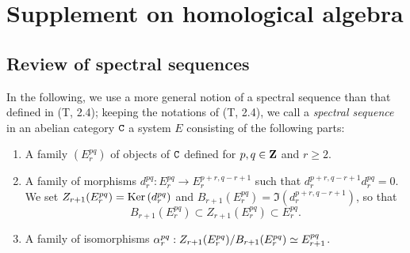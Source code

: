 \section{Supplement on homological algebra}
\label{section:supplement-on-homological-algebra}

\subsection{Review of spectral sequences}
\label{subsection:review-spectral-sequences}

\begin{env}[11.1.1]
\label{0.11.1.1}
In the following, we use a more general notion of a spectral sequence than that defined in (T, 2.4); keeping the notations of (T, 2.4), we call a \emph{spectral sequence} in an abelian category $\mathtt{C}$ a system $E$ consisting of the following parts:
\begin{enumerate}[label=(\alph*)]
  \item A family $(E_r^{pq})$ of objects of $\mathtt{C}$ defined for $p,q\in\mathbf{Z}$ and $r\geq 2$.
  \item A family of morphisms $d_r^{pq}:E_r^{pq}\to E_r^{p+r,q-r+1}$ such that $d_r^{p+r,q-r+1}d_r^{pq}=0$.
    We set $Z_{r+1}(E_r^{pq})={\mathop{\mathrm{Ker}}\nolimits}\,(d_r^{pq})$ and $B_{r+1}(E_r^{pq})=\Im(d_r^{p+r,q-r+1})$, so that
    \[
      B_{r+1}(E_r^{pq})\subset Z_{r+1}(E_r^{pq})\subset E_r^{pq}.
    \]
  \item A family of isomorphisms $\alpha_r^{pq}:Z_{r+1}(E_r^{pq})/B_{r+1}(E_r^{pq})\simeq E_{r+1}^{pq}$.


\end{enumerate}
\end{env}
